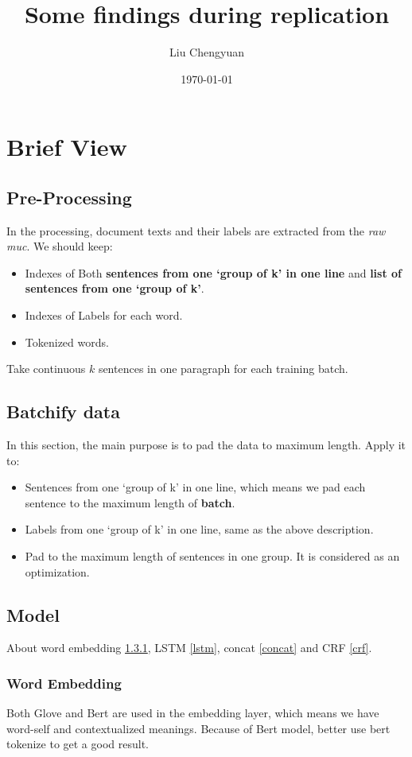 \documentclass[12pt]{article}
\title{Some findings during replication}
\author{Liu Chengyuan}
\date{\today}
\begin{document}
    \maketitle
    \section{Brief View}
    \subsection{Pre-Processing}
    In the processing, document texts and their labels are extracted from the \emph{raw muc}.
    We should keep:
    \begin{itemize}
        \item Indexes of Both \textbf{sentences from one `group of k' in one line}
        and \textbf{list of sentences from one `group of k'}.
        \item Indexes of Labels for each word.
        \item Tokenized words.
    \end{itemize}
    Take continuous $k$ sentences in one paragraph for each training batch.
    \subsection{Batchify data}
    In this section, the main purpose is to pad the data to maximum length. Apply it to:
    \begin{itemize}
        \item Sentences from one `group of k' in one line, which means we pad each sentence to
        the maximum length of \textbf{batch}.
        \item Labels from one `group of k' in one line, same as the above description.
        \item Pad to the maximum length of sentences in one group. It is considered as an optimization.
    \end{itemize}
    \subsection{Model}
    About word embedding \ref{embedding}, LSTM \ref{lstm}, concat \ref{concat} and CRF \ref{crf}.
    \subsubsection{Word Embedding}\label{embedding}
    Both Glove and Bert are used in the embedding layer, which means we have word-self and
    contextualized meanings. Because of Bert model, better use bert tokenize to get a good result.
\end{document}
